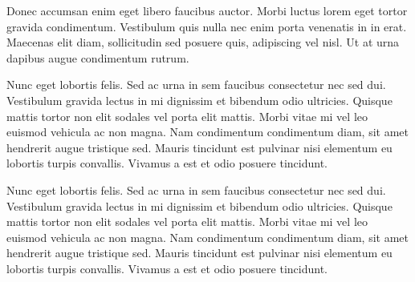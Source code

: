 \documentclass{carver-cyberlaw}
\begin{document}
Donec accumsan enim eget libero faucibus auctor. Morbi luctus lorem eget 
tortor gravida condimentum. Vestibulum quis nulla nec enim porta venenatis in 
in erat. Maecenas elit diam, sollicitudin sed posuere quis, adipiscing vel 
nisl. Ut at urna dapibus augue condimentum rutrum.

Nunc eget lobortis felis. Sed ac urna in sem faucibus consectetur nec sed dui. 
Vestibulum gravida lectus in mi dignissim et bibendum odio ultricies. Quisque 
mattis tortor non elit sodales vel porta elit mattis. Morbi vitae mi vel leo 
euismod vehicula ac non magna. Nam condimentum condimentum diam, sit amet 
hendrerit augue tristique sed. Mauris tincidunt est pulvinar nisi elementum eu 
lobortis turpis convallis. Vivamus a est et odio posuere tincidunt.

Nunc eget lobortis felis. Sed ac urna in sem faucibus consectetur nec sed dui. 
Vestibulum gravida lectus in mi dignissim et bibendum odio ultricies. Quisque 
mattis tortor non elit sodales vel porta elit mattis. Morbi vitae mi vel leo 
euismod vehicula ac non magna. Nam condimentum condimentum diam, sit amet 
hendrerit augue tristique sed. Mauris tincidunt est pulvinar nisi elementum eu 
lobortis turpis convallis. Vivamus a est et odio posuere tincidunt.
\end{document}
